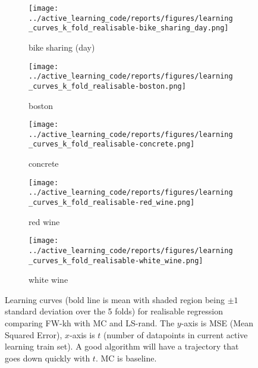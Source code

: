 \begin{figure}[htb]
  \label{figs:realisable-regression-learning-curves}
  \centering
  \begin{subfigure}[b]{0.48\textwidth}
    \label{fig:learning-curve-realisable-bike-sharing}
    \texttt{[image: ../active\_learning\_code/reports/figures/learning\_curves\_k\_fold\_realisable-bike\_sharing\_day.png]}
    \caption{bike sharing (day)}
  \end{subfigure}
  \begin{subfigure}[b]{0.48\textwidth}
    \label{fig:learning-curve-realisable-boston}
    \texttt{[image: ../active\_learning\_code/reports/figures/learning\_curves\_k\_fold\_realisable-boston.png]}
    \caption{boston}
  \end{subfigure}
  \hspace{1.0cm}
  \begin{subfigure}[b]{0.48\textwidth}
    \label{fig:learning-curve-realisable-concrete}
    \texttt{[image: ../active\_learning\_code/reports/figures/learning\_curves\_k\_fold\_realisable-concrete.png]}
    \caption{concrete}
  \end{subfigure}
  \begin{subfigure}[b]{0.48\textwidth}
    \label{fig:learning-curve-realisable-red_whine}
    \texttt{[image: ../active\_learning\_code/reports/figures/learning\_curves\_k\_fold\_realisable-red\_wine.png]}
    \caption{red wine}
  \end{subfigure}
  \hspace{1.0cm}
  \begin{subfigure}[b]{0.48\textwidth}
    \label{fig:learning-curve-realisable-white_wine}
    \texttt{[image: ../active\_learning\_code/reports/figures/learning\_curves\_k\_fold\_realisable-white\_wine.png]}
    \caption{white wine}
  \end{subfigure}
  \caption{Learning curves (bold line is mean with shaded region being \(\pm 1\)
    standard deviation over the 5 folds) for realisable regression comparing FW-kh with MC and
    LS-rand. The \(y\)-axis is MSE (Mean Squared Error), \(x\)-axis is \(t\)
    (number of datapoints in current active learning train set). A good
    algorithm will have a trajectory that goes down quickly with \(t\). MC is baseline.}
\end{figure}

